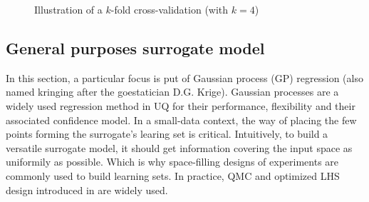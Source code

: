 
\begin{figure}[ht]
    \centering
      \caption{Illustration of a $k$-fold cross-validation (with $k=4$)} 
      \label{fig:kfold}
\end{figure}



\subsection{General purposes surrogate model}

In this section, a particular focus is put of Gaussian process (GP) regression (also named kringing after the goestatician D.G. Krige). 
Gaussian processes are a widely used regression method in UQ for their performance, flexibility and their associated confidence model. 
In a small-data context, the way of placing the few points forming the surrogate's learing set is critical. 
Intuitively, to build a versatile surrogate model, it should get information covering the input space as uniformily as possible. 
Which is why space-filling designs of experiments are commonly used to build learning sets.     
In practice, QMC and optimized LHS design introduced in  are widely used.  

